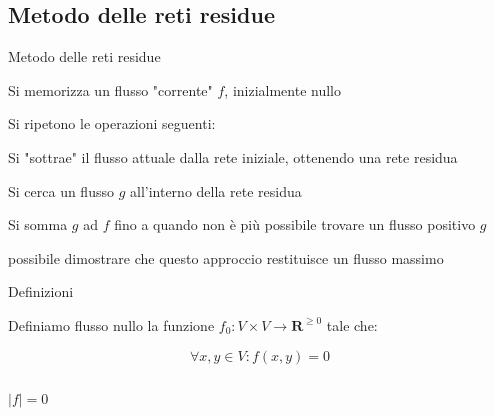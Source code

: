\subsection{Metodo delle reti residue}


\begin{frame}{Metodo delle reti residue}

\vspace{-9pt}
\begin{myboxtitle}
\BIL
\item Si memorizza un flusso "corrente" $f$, inizialmente nullo
\item Si ripetono le operazioni seguenti:
  \BIL
  \item Si "sottrae" il flusso attuale dalla rete iniziale, ottenendo una
    rete residua
  \item Si cerca un flusso $g$ all'interno della rete residua
  \item Si somma $g$ ad $f$
  \EIL
  fino a quando non è più possibile trovare un flusso positivo $g$
\EIL
\end{myboxtitle}

\begin{myboxtitle}[Output]
\EE possibile dimostrare che questo approccio restituisce
un flusso massimo
\end{myboxtitle}

\end{frame}



\begin{frame}{Definizioni}

\vspace{-9pt}
\begin{myboxtitle}
Definiamo \alert{flusso nullo} la funzione 
$f_0: V \times V \rightarrow \mathbf{R}^{\geq 0}$ tale che:

\[
  \forall x,y \in V: f(x,y) = 0
\]
\end{myboxtitle}

\bigskip
\begin{columns}[T]
\[|f| = 0\]
\vspace{-12pt}
\end{columns}

\end{frame}


